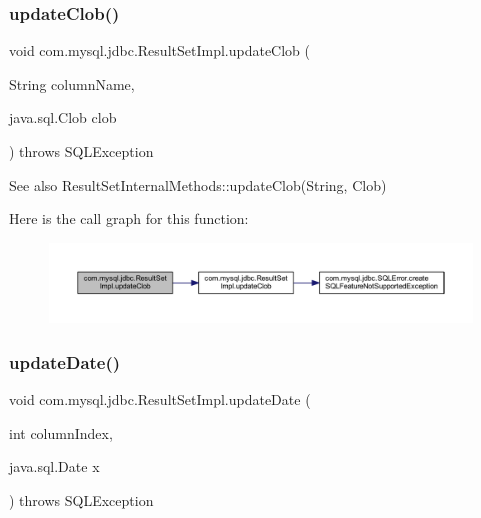 \subsubsection{\texorpdfstring{update\+Clob()}{updateClob()}\hspace{0.1cm}{\footnotesize\ttfamily [2/2]}}
{\footnotesize\ttfamily void com.\+mysql.\+jdbc.\+Result\+Set\+Impl.\+update\+Clob (\begin{DoxyParamCaption}\item[{String}]{column\+Name,  }\item[{java.\+sql.\+Clob}]{clob }\end{DoxyParamCaption}) throws S\+Q\+L\+Exception}

\begin{DoxySeeAlso}{See also}
Result\+Set\+Internal\+Methods\+::update\+Clob(\+String, Clob) 
\end{DoxySeeAlso}
Here is the call graph for this function\+:
\nopagebreak
\begin{figure}[H]
\begin{center}
\leavevmode
\includegraphics[width=350pt]{classcom_1_1mysql_1_1jdbc_1_1_result_set_impl_a9b169ffea6210a494fc74ead38e60d17_cgraph}
\end{center}
\end{figure}
\mbox{\label{classcom_1_1mysql_1_1jdbc_1_1_result_set_impl_a4411849c1033b786838cd008e7ecd76e}} 
\subsubsection{\texorpdfstring{update\+Date()}{updateDate()}\hspace{0.1cm}{\footnotesize\ttfamily [1/2]}}
{\footnotesize\ttfamily void com.\+mysql.\+jdbc.\+Result\+Set\+Impl.\+update\+Date (\begin{DoxyParamCaption}\item[{int}]{column\+Index,  }\item[{java.\+sql.\+Date}]{x }\end{DoxyParamCaption}) throws S\+Q\+L\+Exception}

